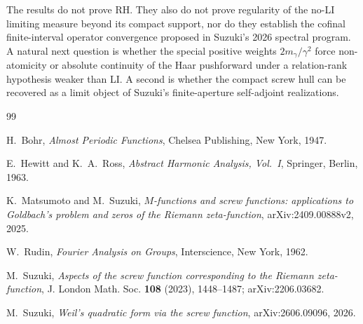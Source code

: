 \documentclass[11pt]{article}
\theoremstyle{remark}
\begin{document}
The results do not prove RH.  They also do not prove regularity of the no-LI limiting measure beyond
its compact support, nor do they establish the cofinal finite-interval operator convergence proposed
in Suzuki's 2026 spectral program.  A natural next question is whether the special positive weights
$2m_\gamma/\gamma^2$ force non-atomicity or absolute continuity of the Haar pushforward under a
relation-rank hypothesis weaker than LI.  A second is whether the compact screw hull can be recovered
as a limit object of Suzuki's finite-aperture self-adjoint realizations.

\begin{thebibliography}{99}

H.~Bohr,
\emph{Almost Periodic Functions},
Chelsea Publishing, New York, 1947.

E.~Hewitt and K.~A.~Ross,
\emph{Abstract Harmonic Analysis, Vol.~I},
Springer, Berlin, 1963.

K.~Matsumoto and M.~Suzuki,
\emph{$M$-functions and screw functions: applications to Goldbach's problem and zeros of the
Riemann zeta-function},
arXiv:2409.00888v2, 2025.

W.~Rudin,
\emph{Fourier Analysis on Groups},
Interscience, New York, 1962.

M.~Suzuki,
\emph{Aspects of the screw function corresponding to the Riemann zeta-function},
J. London Math. Soc. \textbf{108} (2023), 1448--1487;
arXiv:2206.03682.

M.~Suzuki,
\emph{Weil's quadratic form via the screw function},
arXiv:2606.09096, 2026.

\end{thebibliography}
\end{document}
